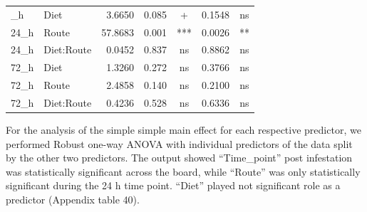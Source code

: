 \documentclass[
  12pt,
  letterpaper,
]{article}
\begin{document}
\begin{longtable}{l|lrrcrc}
\midrule\addlinespace[2.5pt]
\multicolumn{7}{l}{Grouped by Time\_point} \\[2.5pt] 
\midrule\addlinespace[2.5pt]
24\_h & Diet &   3.6650 & 0.085 & + & 0.1548 & ns \\ 
24\_h & Route &  57.8683 & 0.001 & *** & 0.0026 & ** \\ 
24\_h & Diet:Route &   0.0452 & 0.837 & ns & 0.8862 & ns \\ 
72\_h & Diet &   1.3260 & 0.272 & ns & 0.3766 & ns \\ 
72\_h & Route &   2.4858 & 0.140 & ns & 0.2100 & ns \\ 
72\_h & Diet:Route &   0.4236 & 0.528 & ns & 0.6336 & ns \\ 
\bottomrule
\end{longtable}
\endgroup

For the analysis of the simple simple main effect for each respective predictor, we performed Robust one-way ANOVA with individual predictors of the data split by the other two predictors. The output showed ``Time\_point'' post infestation was statistically significant across the board, while ``Route'' was only statistically significant during the 24 h time point. ``Diet'' played not significant role as a predictor (Appendix table 40).
\end{document}
